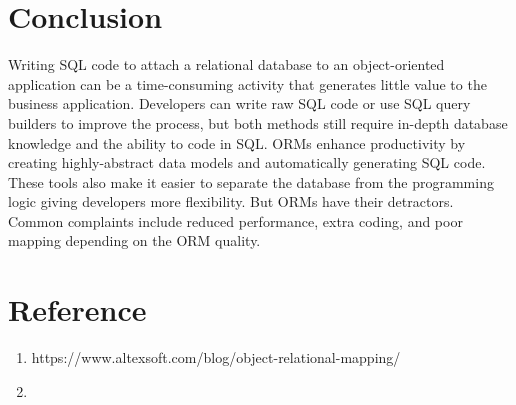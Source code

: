 \documentclass[10pt,a4paper,twoside]{article}
\begin{document}
\section{Conclusion}
Writing SQL code to attach a relational database to an object-oriented application can be a time-consuming activity that generates little value to the business application. Developers can write raw SQL code or use SQL query builders to improve the process, but both methods still require in-depth database knowledge and the ability to code in SQL. ORMs enhance productivity by creating highly-abstract data models and automatically generating SQL code. These tools also make it easier to separate the database from the programming logic giving developers more flexibility. But ORMs have their detractors. Common complaints include reduced performance, extra coding, and poor mapping depending on the ORM quality.


\section{Reference}
\begin{enumerate}
\item https://www.altexsoft.com/blog/object-relational-mapping/
\item 
\end{enumerate}
\end{document}
